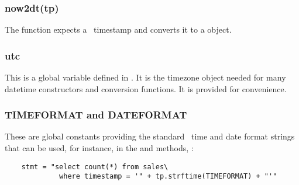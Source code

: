 \subsubsection{now2dt(tp)}
The function expects a \nowdb\ timestamp
and converts it to a  object.

\subsubsection{utc}
This is a global variable defined in .
It is the  timezone object needed
for many datetime constructors and conversion functions.
It is provided for convenience.

\subsubsection{TIMEFORMAT and DATEFORMAT}
These are global constants providing the
standard \nowdb\ time and date format
strings that can be used, for instance,
in the 
 and  methods, \eg:

\begin{python}
\begin{lstlisting}
    stmt = "select count(*) from sales\
             where timestamp = '" + tp.strftime(TIMEFORMAT) + "'"
\end{lstlisting}
\end{python}
